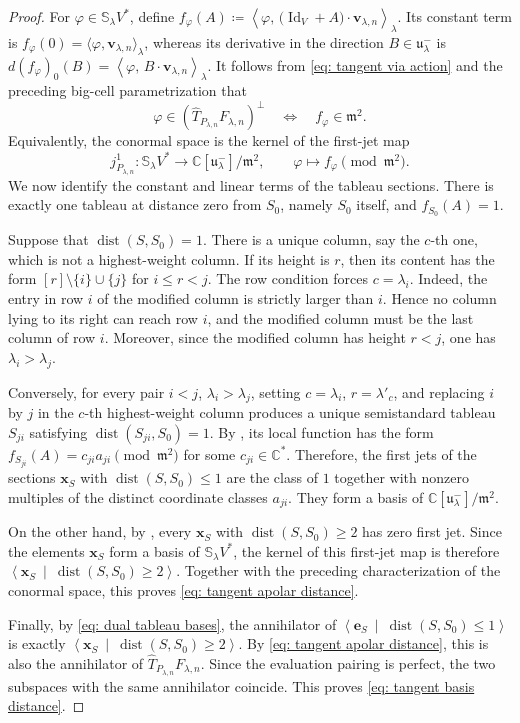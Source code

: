\documentclass[a4paper,reqno]{amsart}
\theoremstyle{plainnopunct}
\theoremstyle{definitionnopunct}
\newcommand{\C}{\mathbb{C}}
\renewcommand{\S}{\mathbb{S}}
\newcommand{\dist}{\operatorname{dist}}
\newcommand{\be}{\mathbf{e}}
\newcommand{\bx}{\mathbf{x}}
\newcommand{\bv}{\mathbf{v}}
\begin{document}
\begin{proof}
For $\varphi\in\S_\lambda V^*$, define
$f_\varphi(A)
\coloneq
\left\langle
\varphi,\,
\bigl(\operatorname{Id}_V+A\bigr)\cdot\bv_{\lambda,n}
\right\rangle_\lambda$.
Its constant term is $f_\varphi(0)
=
\langle\varphi,\bv_{\lambda,n}\rangle_\lambda$, whereas its derivative in the direction $B\in\mathfrak u^-_\lambda$ is $d(f_\varphi)_0(B) = \left\langle
\varphi,\, B\cdot\bv_{\lambda,n} \right\rangle_\lambda$.
It follows from \eqref{eq: tangent via action} and the preceding big-cell parametrization that
\[
\varphi\in
\left(
\widehat T_{P_{\lambda,n}}F_{\lambda,n}
\right)^\perp
\quad\Longleftrightarrow\quad
f_\varphi\in\mathfrak m^2.
\]Equivalently, the conormal space is the kernel of the first-jet map
\[j^1_{P_{\lambda,n}}:
\S_\lambda V^*
\longrightarrow
\C[\mathfrak u^-_\lambda]/\mathfrak m^2,
\qquad
\varphi
\longmapsto
f_\varphi
\pmod{\mathfrak m^2}.
\]
We now identify the constant and linear terms of the tableau sections. There is exactly one tableau at distance zero from $S_0$, namely $S_0$ itself, and $f_{S_0}(A)=1$.

Suppose that $\dist(S,S_0)=1$. There is a unique column, say the $c$-th one, which is not a highest-weight column. If its height is $r$, then its content has the form $[r]\setminus\{i\}\cup\{j\}$ for $i\leq r<j$.
The row condition forces $c=\lambda_i$.
Indeed, the entry in row $i$ of the modified column is strictly larger than $i$. Hence no column lying to its right can reach row $i$, and the modified column must be the last column of row $i$. Moreover, since the modified column has height $r<j$, one has $\lambda_i>\lambda_j$.

Conversely, for every pair $i<j$, $\lambda_i>\lambda_j$, setting $c=\lambda_i$, $r=\lambda'_c$,  and replacing $i$ by $j$ in the $c$-th highest-weight column produces a unique semistandard tableau $S_{ji}$ satisfying $\dist(S_{ji},S_0)=1$. By , its local function has the form $
f_{S_{ji}}(A)
=
c_{ji}a_{ji}
\pmod{\mathfrak m^2}
$
for some $c_{ji}\in\C^*$. Therefore, the first jets of the sections $\bx_S$ with $\dist(S,S_0)\leq1$ are the class of $1$ together with nonzero multiples of the distinct coordinate classes $a_{ji}$. They form a basis of $\C[\mathfrak u^-_\lambda]/\mathfrak m^2$.

On the other hand, by , every $\bx_S$ with $\dist(S,S_0)\geq2$ has zero first jet. Since the elements $\bx_S$ form a basis of $\S_\lambda V^*$, the kernel of this first-jet map is therefore
$
\left\langle
\bx_S
\ \middle|\
\dist(S,S_0)\geq2
\right\rangle$. Together with the preceding characterization of the conormal space, this proves \eqref{eq: tangent apolar distance}.

Finally, by \eqref{eq: dual tableau bases}, the annihilator of $\left\langle
\be_S
\ \middle|\
\dist(S,S_0)\leq1
\right\rangle$  is exactly $\left\langle \bx_S
\ \middle|\ \dist(S,S_0)\geq2 \right\rangle$.
By \eqref{eq: tangent apolar distance}, this is also the annihilator of $\widehat{T}_{P_{\lambda,n}}F_{\lambda,n}$.
Since the evaluation pairing is perfect, the two subspaces with the same annihilator coincide. This proves \eqref{eq: tangent basis distance}.
\end{proof}
\end{document}
